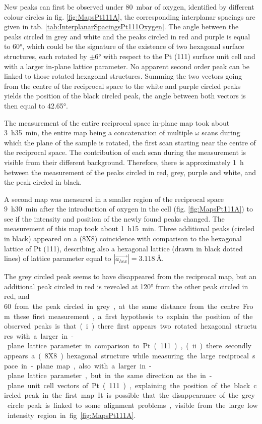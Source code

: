 New peaks can first be observed under \qty{80}{\milli\bar} of oxygen, identified by different colour circles in fig. \ref{fig:MapsPt111A}, the corresponding interplanar spacings are given in tab. \ref{tab:InterplanarSpacingsPt111Oxygen}.
The angle between the peaks circled in grey and white and the peaks circled in red and purple is equal to \ang{60}, which could be the signature of the existence of two hexagonal surface structures, each rotated by $\pm \ang{6}$ with respect to the Pt (111) surface unit cell and with a larger in-plane lattice parameter.
No apparent second order peak can be linked to those rotated hexagonal structures.
Summing the two vectors going from the centre of the reciprocal space to the white and purple circled peaks yields the position of the black circled peak, the angle between both vectors is then equal to \ang{42.65}.

The measurement of the entire reciprocal space in-plane map took about \qty{3}{\hour}\qty{35}{\minute}, the entire map being a concatenation of multiple $\omega$ scans during which the plane of the sample is rotated, the first scan starting near the centre of the reciprocal space.
The contribution of each scan during the measurement is visible from their different background.
Therefore, there is approximately \qty{1}{\hour} between the measurement of the peaks circled in red, grey, purple and white, and the peak circled in black.

A second map was measured in a smaller region of the reciprocal space \qty{9}{\hour}\qty{30}{\minute} after the introduction of oxygen in the cell (fig. \ref{fig:MapsPt111A}) to see if the intensity and position of the newly found peaks changed.
The measurement of this map took about \qty{1}{\hour}\qty{15}{\minute}.
Three additional peaks (circled in black) appeared on a (8X8) coincidence with comparison to the hexagonal lattice of Pt (111), describing also a hexagonal lattice (drawn in black dotted lines) of lattice parameter equal to $|\vec{a_{hex}}| = \qty{3.118}{\angstrom}$.

The grey circled peak seems to have disappeared from the reciprocal map, but an additional peak circled in red is revealed at \ang{120} from the other peak circled in red, and \qty{60} from the peak circled in grey, at the same distance from the centre.
From these first measurement, a first hypothesis to explain the position of the observed peaks is that (i) there first appears two rotated hexagonal structures with a larger in-plane lattice parameter in comparison to Pt (111), (ii) there secondly appears a (8X8) hexagonal structure while measuring the large reciprocal space in-plane map, also with a larger in-plane lattice parameter, but in the same direction as the in-plane unit cell vectors of Pt (111), explaining the position of the black circled peak in the first map.
It is possible that the disappearance of the grey circle peak is linked to some alignment problems, visible from the large low intensity region in fig. \ref{fig:MapsPt111A}.

